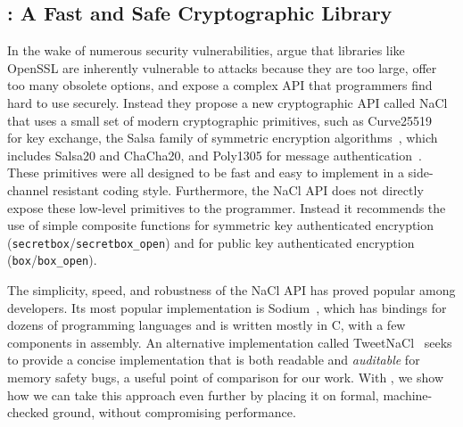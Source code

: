 \documentclass[acmsmall,review,anonymous]{acmart}\settopmatter{printfolios=true}
\begin{document}
\subsection{\haclstar: A Fast and Safe Cryptographic Library}
\label{sec:haclstar}


In the wake of numerous security vulnerabilities,
\citet{bernstein2012security} argue that libraries like OpenSSL are
inherently vulnerable to attacks because they are too large, offer too many obsolete options, and
expose a complex API that programmers find hard to use securely.
%
Instead they propose a new cryptographic API called NaCl that uses a
small set of modern cryptographic primitives, such as
Curve25519~\cite{curve25519} for key exchange, the Salsa family of
symmetric encryption algorithms~\cite{bernstein2008salsa20}, which
includes Salsa20 and ChaCha20, and Poly1305 for message
authentication~\cite{bernstein2005poly1305}.
%
These primitives were all designed to be fast and easy to implement
in a side-channel resistant coding style.
%
Furthermore, the NaCl API does not directly expose these low-level
primitives to the programmer. Instead it recommends the use of simple
composite functions for symmetric key authenticated encryption
(\texttt{secretbox}/\texttt{secretbox\_open}) 
and for public key authenticated encryption (\texttt{box}/\texttt{box\_open}).

The simplicity, speed, and robustness of the NaCl API has proved popular among 
developers. Its most popular implementation is Sodium~\cite{libsodium}, which has bindings
for dozens of programming languages and is written mostly in C, with a few components in assembly.
%
An alternative implementation called TweetNaCl~\cite{bernstein2014tweetnacl} seeks
to provide a concise implementation that is both readable and \emph{auditable} for 
memory safety bugs, a useful point of comparison for our work.
%
With \lowstar, we show how we can take this approach even further by
placing it on formal, machine-checked ground, without compromising
performance.
\end{document}
